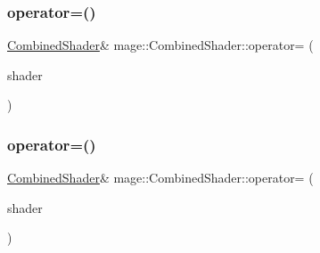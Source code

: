\hypertarget{structmage_1_1_combined_shader_a14859fb597c07309fd269b56af373c02}{}\label{structmage_1_1_combined_shader_a14859fb597c07309fd269b56af373c02} 
\subsubsection{\texorpdfstring{operator=()}{operator=()}\hspace{0.1cm}{\footnotesize\ttfamily [1/2]}}
{\footnotesize\ttfamily \hyperlink{structmage_1_1_combined_shader}{Combined\+Shader}\& mage\+::\+Combined\+Shader\+::operator= (\begin{DoxyParamCaption}\item[{const \hyperlink{structmage_1_1_combined_shader}{Combined\+Shader} \&}]{shader }\end{DoxyParamCaption})\hspace{0.3cm}{\ttfamily [default]}}

\hypertarget{structmage_1_1_combined_shader_ad05cf0e2c4f0cd7d37ad5be971aefd1b}{}\label{structmage_1_1_combined_shader_ad05cf0e2c4f0cd7d37ad5be971aefd1b} 
\subsubsection{\texorpdfstring{operator=()}{operator=()}\hspace{0.1cm}{\footnotesize\ttfamily [2/2]}}
{\footnotesize\ttfamily \hyperlink{structmage_1_1_combined_shader}{Combined\+Shader}\& mage\+::\+Combined\+Shader\+::operator= (\begin{DoxyParamCaption}\item[{\hyperlink{structmage_1_1_combined_shader}{Combined\+Shader} \&\&}]{shader }\end{DoxyParamCaption})\hspace{0.3cm}{\ttfamily [default]}}

\hypertarget{structmage_1_1_combined_shader_a44e0bbd1342b772d4d1d49b4e614f3b1}{}\label{structmage_1_1_combined_shader_a44e0bbd1342b772d4d1d49b4e614f3b1} 
